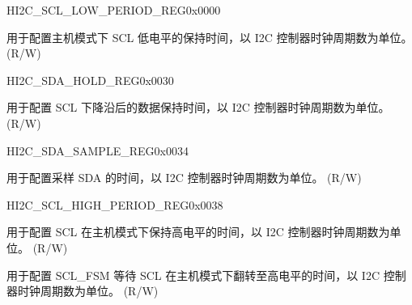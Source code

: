 \begin{register}{H}{I2C\_SCL\_LOW\_PERIOD\_REG}{0x0000}\label{regdesc:I2CSCLLOWPERIODREG}
%
%
\regnewline%
\begin{regdesc}\begin{reglist}
\label{fielddesc:I2CSCLLOWPERIOD}\item [I2C\_SCL\_LOW\_PERIOD] 用于配置主机模式下 SCL 低电平的保持时间，以 I2C 控制器时钟周期数为单位。 (R/W)
\end{reglist}\end{regdesc}
\end{register}


\begin{register}{H}{I2C\_SDA\_HOLD\_REG}{0x0030}\label{regdesc:I2CSDAHOLDREG}
%
%
\regnewline%
\begin{regdesc}\begin{reglist}
\label{fielddesc:I2CSDAHOLDTIME}\item [I2C\_SDA\_HOLD\_TIME] 用于配置 SCL 下降沿后的数据保持时间，以 I2C 控制器时钟周期数为单位。 (R/W)
\end{reglist}\end{regdesc}
\end{register}


\begin{register}{H}{I2C\_SDA\_SAMPLE\_REG}{0x0034}\label{regdesc:I2CSDASAMPLEREG}
%
%
\regnewline%
\begin{regdesc}\begin{reglist}
\label{fielddesc:I2CSDASAMPLETIME}\item [I2C\_SDA\_SAMPLE\_TIME] 用于配置采样 SDA 的时间，以 I2C 控制器时钟周期数为单位。 (R/W)
\end{reglist}\end{regdesc}
\end{register}


\begin{register}{H}{I2C\_SCL\_HIGH\_PERIOD\_REG}{0x0038}\label{regdesc:I2CSCLHIGHPERIODREG}
%
%
%
\regnewline%
\begin{regdesc}\begin{reglist}
\label{fielddesc:I2CSCLHIGHPERIOD}\item [I2C\_SCL\_HIGH\_PERIOD] 用于配置 SCL 在主机模式下保持高电平的时间，以 I2C 控制器时钟周期数为单位。 (R/W)
\label{fielddesc:I2CSCLWAITHIGHPERIOD}\item [I2C\_SCL\_WAIT\_HIGH\_PERIOD] 用于配置 SCL\_FSM 等待 SCL 在主机模式下翻转至高电平的时间，以 I2C 控制器时钟周期数为单位。 (R/W)
\end{reglist}\end{regdesc}
\end{register}



